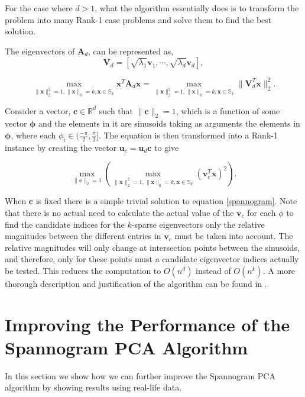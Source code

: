 \documentclass[graybox]{svmult}
\begin{document}
For the case where $d > 1$, what the algorithm essentially does is to transform the problem into many Rank-1 case problems and solve them to find the best solution.

The eigenvectors of $\mathbf{A}_d$, can be represented as,
\begin{equation*}
\mathbf{V}_d = [\sqrt{\lambda_1}\mathbf{v}_1, \cdots, \sqrt{\lambda_d}\mathbf{v}_d],
\end{equation*}

\begin{equation*}
\underset{\|\mathbf{x}\|_2^2 = 1, \|\mathbf{x}\|_0 = k, \mathbf{x} \in\mathbb{S}_k} \max  \mathbf{x}^T\mathbf{A}_d\mathbf{x} 
= \underset{\|\mathbf{x}\|_2^2 = 1, \|\mathbf{x}\|_0 = k, \mathbf{x} \in\mathbb{S}_k}\max\|\mathbf{V}_d^T\mathbf{x}\|_2^2.
\end{equation*}


Consider a vector, $\mathbf{c} \in \mathbb{R}^d$ such that $\|\mathbf{c}\|_2=1$, which is a function of some vector $\mathbf{\phi}$ and the elements in it are sinusoids taking as arguments the elements in $\mathbf{\phi}$, where each $\phi_i \in (\frac{-\pi}{2}, \frac{\pi}{2}]$.
The equation is then transformed into a Rank-1 instance by creating the vector $\mathbf{u}_c = \mathbf{u}_d \mathbf{c}$ to give 

\begin{equation}
\max_{\|\mathbf{c}\|_2 =1} \left(\underset{\|\mathbf{x}\|_2^2 = 1, \|\mathbf{x}\|_0 = k, \mathbf{x} \in\mathbb{S}_k}\max\left(\mathbf{v}_c^T \mathbf{x}\right)^2 \right).
\label{spannogram}
\end{equation}

When $\mathbf{c}$ is fixed there is a simple trivial solution to  equation \ref{spannogram}. Note that there is no actual need to calculate the actual value of the $\mathbf{v}_c$ for each $\phi$ to find the candidate indices for the $k$-sparse eigenvectors only the relative magnitudes between the different entries in  $\mathbf{v}_c$ must be taken into account. The relative magnitudes will only change at intersection points between the sinusoids, and therefore, only for these points must a candidate eigenvector indices actually be tested. This reduces the computation to $O \left(n^d\right)$ instead of $O \left(n^k\right)$. A more thorough description and justification of the algorithm can be found in \cite{dimakis}.


\section{Improving the Performance of the Spannogram PCA Algorithm}
\label{improvement}
In this section we show how we can further improve the Spannogram PCA algorithm by showing results using real-life data.
\end{document}
